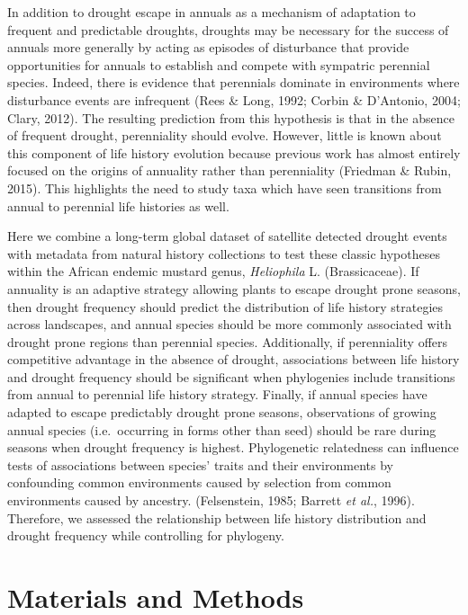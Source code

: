 \documentclass[man,floatsintext]{apa6}
\theoremstyle{definition}
\theoremstyle{definition}
\theoremstyle{definition}
\theoremstyle{remark}
\begin{document}
In addition to drought escape in annuals as a mechanism of adaptation to
frequent and predictable droughts, droughts may be necessary for the
success of annuals more generally by acting as episodes of disturbance
that provide opportunities for annuals to establish and compete with
sympatric perennial species. Indeed, there is evidence that perennials
dominate in environments where disturbance events are infrequent (Rees
\& Long, 1992; Corbin \& D'Antonio, 2004; Clary, 2012). The resulting
prediction from this hypothesis is that in the absence of frequent
drought, perenniality should evolve. However, little is known about this
component of life history evolution because previous work has almost
entirely focused on the origins of annuality rather than perenniality
(Friedman \& Rubin, 2015). This highlights the need to study taxa which
have seen transitions from annual to perennial life histories as well.

Here we combine a long-term global dataset of satellite detected drought
events with metadata from natural history collections to test these
classic hypotheses within the African endemic mustard genus,
\emph{Heliophila} L. (Brassicaceae). If annuality is an adaptive
strategy allowing plants to escape drought prone seasons, then drought
frequency should predict the distribution of life history strategies
across landscapes, and annual species should be more commonly associated
with drought prone regions than perennial species. Additionally, if
perenniality offers competitive advantage in the absence of drought,
associations between life history and drought frequency should be
significant when phylogenies include transitions from annual to
perennial life history strategy. Finally, if annual species have adapted
to escape predictably drought prone seasons, observations of growing
annual species (i.e.~occurring in forms other than seed) should be rare
during seasons when drought frequency is highest. Phylogenetic
relatedness can influence tests of associations between species' traits
and their environments by confounding common environments caused by
selection from common environments caused by ancestry. (Felsenstein,
1985; Barrett \emph{et al.}, 1996). Therefore, we assessed the
relationship between life history distribution and drought frequency
while controlling for phylogeny.

\hypertarget{materials-and-methods}{%
\section{Materials and Methods}\label{materials-and-methods}}
\end{document}
